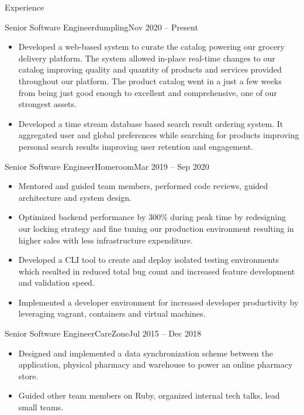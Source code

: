 \documentclass{mcdowellcv}
\begin{document}
\begin{cvsection}{Experience}
	\begin{cvsubsection}{Senior Software Engineer}{dumpling}{Nov 2020 -- Present}
		\begin{itemize}
    \item Developed a web-based system to curate the catalog powering our grocery delivery platform. The system allowed in-place real-time changes to our catalog improving quality and quantity of products and services provided throughout our platform. The product catalog went in a just a few weeks from being just good enough to excellent and comprehensive, one of our strongest assets.
    \item Developed a time stream database based search result ordering system. It aggregated user and global preferences while searching for products improving personal search results improving user retention and engagement.
		\end{itemize}
	\end{cvsubsection}
	\begin{cvsubsection}{Senior Software Engineer}{Homeroom}{Mar 2019 -- Sep 2020}
		\begin{itemize}
    \item Mentored and guided team members, performed code reviews, guided architecture and system design.
    \item Optimized backend performance by 300\% during peak time by redesigning our locking strategy and fine tuning our production environment resulting in higher sales with less infrastructure expenditure.
    \item Developed a CLI tool to create and deploy isolated testing environments which resulted in reduced total bug count and increased feature development and validation speed.
    \item Implemented a developer environment for increased developer productivity by leveraging vagrant, containers and virtual machines.
		\end{itemize}
	\end{cvsubsection}
	\begin{cvsubsection}{Senior Software Engineer}{CareZone}{Jul 2015 -- Dec 2018}
		\begin{itemize}
    \item Designed and implemented a data synchronization scheme between the application, physical pharmacy and warehouse to power an online pharmacy store.
    \item Guided other team members on Ruby, organized internal tech talks, lead small teams.

\end{itemize}
\end{cvsubsection}
\end{cvsection}
\end{document}
